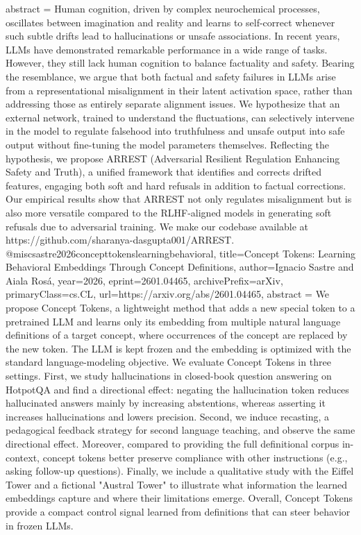 {      abstract = {Human cognition, driven by complex neurochemical processes, oscillates between imagination and reality and learns to self-correct whenever such subtle drifts lead to hallucinations or unsafe associations. In recent years, LLMs have demonstrated remarkable performance in a wide range of tasks. However, they still lack human cognition to balance factuality and safety. Bearing the resemblance, we argue that both factual and safety failures in LLMs arise from a representational misalignment in their latent activation space, rather than addressing those as entirely separate alignment issues. We hypothesize that an external network, trained to understand the fluctuations, can selectively intervene in the model to regulate falsehood into truthfulness and unsafe output into safe output without fine-tuning the model parameters themselves. Reflecting the hypothesis, we propose ARREST (Adversarial Resilient Regulation Enhancing Safety and Truth), a unified framework that identifies and corrects drifted features, engaging both soft and hard refusals in addition to factual corrections. Our empirical results show that ARREST not only regulates misalignment but is also more versatile compared to the RLHF-aligned models in generating soft refusals due to adversarial training. We make our codebase available at https://github.com/sharanya-dasgupta001/ARREST.}
}@misc{sastre2026concepttokenslearningbehavioral,
      title={Concept Tokens: Learning Behavioral Embeddings Through Concept Definitions}, 
      author={Ignacio Sastre and Aiala Rosá},
      year={2026},
      eprint={2601.04465},
      archivePrefix={arXiv},
      primaryClass={cs.CL},
      url={https://arxiv.org/abs/2601.04465},
      abstract = {We propose Concept Tokens, a lightweight method that adds a new special token to a pretrained LLM and learns only its embedding from multiple natural language definitions of a target concept, where occurrences of the concept are replaced by the new token. The LLM is kept frozen and the embedding is optimized with the standard language-modeling objective. We evaluate Concept Tokens in three settings. First, we study hallucinations in closed-book question answering on HotpotQA and find a directional effect: negating the hallucination token reduces hallucinated answers mainly by increasing abstentions, whereas asserting it increases hallucinations and lowers precision. Second, we induce recasting, a pedagogical feedback strategy for second language teaching, and observe the same directional effect. Moreover, compared to providing the full definitional corpus in-context, concept tokens better preserve compliance with other instructions (e.g., asking follow-up questions). Finally, we include a qualitative study with the Eiffel Tower and a fictional "Austral Tower" to illustrate what information the learned embeddings capture and where their limitations emerge. Overall, Concept Tokens provide a compact control signal learned from definitions that can steer behavior in frozen LLMs.}
}
